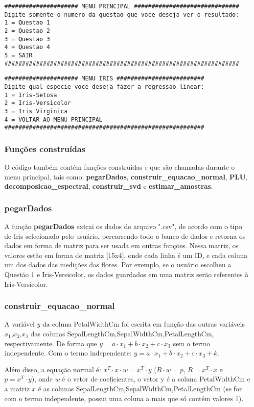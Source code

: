 \documentclass[a4paper,12pt,twoside]{article}
\begin{document}
\begin{lstlisting}
##################### MENU PRINCIPAL ##############################
Digite somente o numero da questao que voce deseja ver o resultado: 
1 = Questao 1
2 = Questao 2
3 = Questao 3
4 = Questao 4
5 = SAIR
###################################################################
\end{lstlisting}

\begin{lstlisting}
##################### MENU IRIS #########################
Digite qual especie voce deseja fazer a regressao linear: 
1 = Iris-Setosa
2 = Iris-Versicolor
3 = Iris Virginica
4 = VOLTAR AO MENU PRINCIPAL
#########################################################
\end{lstlisting}

\subsubsection{Funções construídas}
O código também contém funções construídas e que são chamadas durante o menu principal, tais como: \textbf{pegarDados}, \textbf{construir\_equacao\_normal}, \textbf{PLU}, \textbf{decomposicao\_espectral}, \textbf{construir\_svd} e \textbf{estimar\_amostras}.
\subsubsection{pegarDados}
   A função \textbf{pegarDados} extrai os dados do arquivo ".csv", de acordo com o tipo de Iris selecionado pelo usuário, percorrendo todo o banco de dados e retorna os dados em forma de matriz para ser usada em outras funções. Nessa matriz, os valores estão em forma de matriz [15x4], onde cada linha é um ID, e cada coluna um dos dados das medições das flores. Por exemplo, se o usuário escolheu a Questão 1 e Iris-Versicolor, os dados guardados em uma matriz serão referentes à Iris-Versicolor.
\subsubsection{construir\_equacao\_normal}
A variável $y$ da coluna PetalWidthCm foi escrita em função das outras variáveis $x_{1}$,$x_{2}$,$x_{3}$ das colunas SepalLengthCm,SepalWidthCm,PetalLengthCm, respectivamente. De forma que 
$y= a\cdot x_{1} +b\cdot x_{2}+c\cdot x_{3}$ sem o termo independente. Com o termo independente: $y= a\cdot x_{1} +b\cdot x_{2}+c\cdot x_{3} +k$.

    Além disso, a equação normal é: $x^{T}\cdot x\cdot w=x^{T}\cdot y$ ($R\cdot w=p$, $R=x^{T}\cdot x$ e $p = x^{T}\cdot y$), onde $w$ é o vetor de coeficientes, o vetor y é a coluna PetalWidthCm e a matriz $x$ é as colunas SepalLengthCm,SepalWidthCm,PetalLengthCm (se for com o termo independente, possui uma coluna a mais que só contém valores 1).
    
\end{document}
